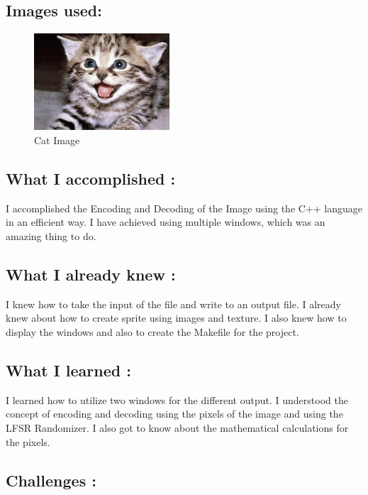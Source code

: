 \subsection{Images used:}\label{sec:ps1b:img}
\begin{figure}[h]
    \centering
    \includegraphics[width=0.45\textwidth]{ps1b/cat.png}
    \caption{Cat Image}
    \label{fig:mesh1}
\end{figure}


\subsection{What I accomplished :}\label{sec:ps1b:accomplish}

I accomplished the Encoding and Decoding of the Image using the C++ language in an efficient way. I have achieved using multiple windows, which was an amazing thing to do. 

\subsection{What I already knew :}\label{sec:ps1b:knew}

I knew how to take the input of the file and write to an output file. I already knew about how to create sprite using images and texture. I also knew how to display the windows and also to create the Makefile for the project.

\subsection{What I learned :}\label{sec:ps1b:learn}

I learned how to utilize two windows for the different output. I understood the concept of encoding and decoding using the pixels of the image and using the LFSR Randomizer. I also got to know about the mathematical calculations for the pixels.

\subsection{Challenges :}\label{sec:ps1b:challenges}

